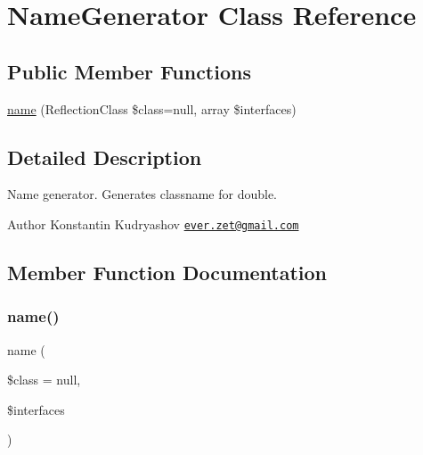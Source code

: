 \hypertarget{class_prophecy_1_1_doubler_1_1_name_generator}{}\section{Name\+Generator Class Reference}
\label{class_prophecy_1_1_doubler_1_1_name_generator}
\subsection*{Public Member Functions}
\begin{DoxyCompactItemize}
\item 
\mbox{\hyperlink{class_prophecy_1_1_doubler_1_1_name_generator_a591152fe3f57453253f827cd4c1593ed}{name}} (Reflection\+Class \$class=null, array \$interfaces)
\end{DoxyCompactItemize}


\subsection{Detailed Description}
Name generator. Generates classname for double.

\begin{DoxyAuthor}{Author}
Konstantin Kudryashov \href{mailto:ever.zet@gmail.com}{\tt ever.\+zet@gmail.\+com} 
\end{DoxyAuthor}


\subsection{Member Function Documentation}
\mbox{\label{class_prophecy_1_1_doubler_1_1_name_generator_a591152fe3f57453253f827cd4c1593ed}} 
\subsubsection{\texorpdfstring{name()}{name()}}
{\footnotesize\ttfamily name (\begin{DoxyParamCaption}\item[{Reflection\+Class}]{\$class = {\ttfamily null},  }\item[{array}]{\$interfaces }\end{DoxyParamCaption})}

